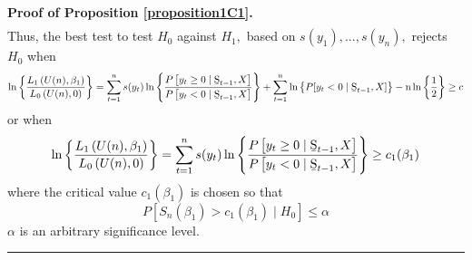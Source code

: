 \documentclass[harvard,11pt]{article}
\newenvironment{proof}[1][Proof]{\textbf{#1.} }{\  \rule{0.5em}{0.5em}}
\begin{document}
\begin{proof}[Proof of Proposition \protect\ref{proposition1C1}]
\begin{eqnarray*}
\end{eqnarray*}%
Thus, the best test to test $H_{0}$ against $H_{1},$ based on $%
s(y_{1}),...,s(y_{n}),$ rejects $H_{0}$ when%
\begin{equation*}
\ln \left\{ \frac{L_{1}\left( U(n),\beta _{1}\right) }{L%
_{0}\left( U(n),0\right) }\right\} =\sum\limits_{t=1}^{n}s(y_{t})\ln \left\{ 
\frac{P\left[ y_{t}\geq 0\mid \text{\b{S}}_{t-1},X\right] }{P%
\left[ y_{t}<0\mid \text{\b{S}}_{t-1},X\right] }\right\}
+\sum\limits_{t=1}^{n}\ln \left\{ P[y_{t}<0\mid \text{\b{S}}%
_{t-1},X]\right\} -\text{n}\ln \left\{ \frac{1}{2}\right\} \geq c
\end{equation*}%
or when%
\begin{equation*}
\ln \left\{ \frac{L_{1}\left( U(n),\beta _{1}\right) }{L%
_{0}\left( U(n),0\right) }\right\} =\sum\limits_{t=1}^{n}s(y_{t})\ln \left\{ 
\frac{P\left[ y_{t}\geq 0\mid \text{\b{S}}_{t-1},X\right] }{P%
\left[ y_{t}<0\mid \text{\b{S}}_{t-1},X\right] }\right\} \geq c_{1}(\beta _{1})
\end{equation*}%
where the critical value $c_{1}(\beta _{1})$ is chosen so that%
\begin{equation*}
P\left[ S_{n}(\beta _{1})>c_{1}(\beta _{1})\mid H_{0}\right] \leq
\alpha
\end{equation*}%
$\alpha $ is an arbitrary significance level.
\end{proof}
\end{document}
